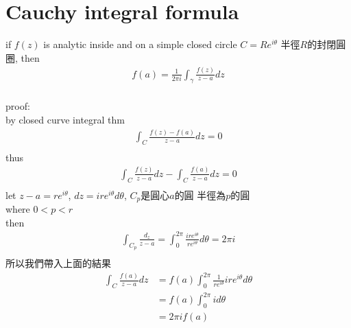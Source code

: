\documentclass{article}
\begin{document}
\section{Cauchy integral formula}
if $f(z)$ is analytic inside and on a simple closed circle $C=R e^{i\theta}$ 半徑$R$的封閉圓圈, then
\begin{align*}
    f(a) = \frac{1}{2\pi i} \int_{\gamma} \frac{f(z)}{z-a} dz \\    
\end{align*}
\begin{flushleft}
proof:\\
by closed curve integral thm
\begin{align*}
    \int_{C}\frac{f(z)-f(a)}{z-a} dz = 0 \\
\end{align*}
thus
\begin{align*}
    \int_{C} \frac{f(z)}{z-a} dz - \int_{C} \frac{f(a)}{z-a} dz = 0\\
\end{align*}
let $z-a = re^{i\theta}$, $dz = ire^{i\theta} d\theta$, $C_{p}$是圓心$a$的圓 半徑為$p$的圓\\
where $0 < p < r$\\
then
\begin{align*}
    \int_{C_{p}} \frac{d_z}{z-a} = \int_{0}^{2\pi} \frac{ire^{i\theta}}{re^{i\theta}}  d\theta = 2\pi i \\
\end{align*}
所以我們帶入上面的結果\\
\begin{align*}
    \int_{C} \frac{f(a)}{z-a} dz &= f(a) \int_{0}^{2\pi} \frac{1}{re^{i\theta}} ire^{i\theta} d\theta \\
    &= f(a) \int_{0}^{2\pi} i d\theta \\
    &= 2\pi if(a) \\
\end{align*}
\end{flushleft}
\end{document}
